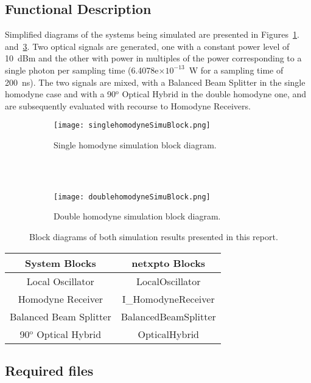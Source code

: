 \documentclass[../../sdf/tex/cv_system]{subfiles}
\begin{document}
\subsection{Functional Description}

Simplified diagrams of the systems being simulated are presented in Figures~\ref{fig:singleH}. and~\ref{fig:doubleH}. Two optical signals are generated, one with a constant power level of 10~dBm and the other with power in multiples of the power corresponding to a single photon per sampling time (6.4078e$\times10^{-13}$~W for a sampling time of 200~ns). The two signals are mixed, with a Balanced Beam Splitter in the single homodyne case and with a 90$^\text{o}$ Optical Hybrid in the double homodyne one, and are subsequently evaluated with recourse to Homodyne Receivers.

\begin{figure}[h]
\centering
\begin{subfigure}{\linewidth}
\texttt{[image: singlehomodyneSimuBlock.png]}
\caption{Single homodyne simulation block diagram.}
\label{fig:singleH}
\end{subfigure}
\\
~
\\
\begin{subfigure}{\linewidth}
\texttt{[image: doublehomodyneSimuBlock.png]}
\caption{Double homodyne simulation block diagram.}
\label{fig:doubleH}
\end{subfigure}
\caption{Block diagrams of both simulation results presented in this report.}
\end{figure}

\begin{table}[H]
\centering
\begin{tabular}{c|c}
System Blocks          & netxpto Blocks       \\ \hline
Local Oscillator       & LocalOscillator      \\
Homodyne Receiver      & I\_HomodyneReceiver   \\
Balanced Beam Splitter & BalancedBeamSplitter \\
90$^\text{o}$ Optical Hybrid     & OpticalHybrid
\end{tabular}
\end{table}

\pagebreak
\subsection{Required files}\label{Required files}
\end{document}
